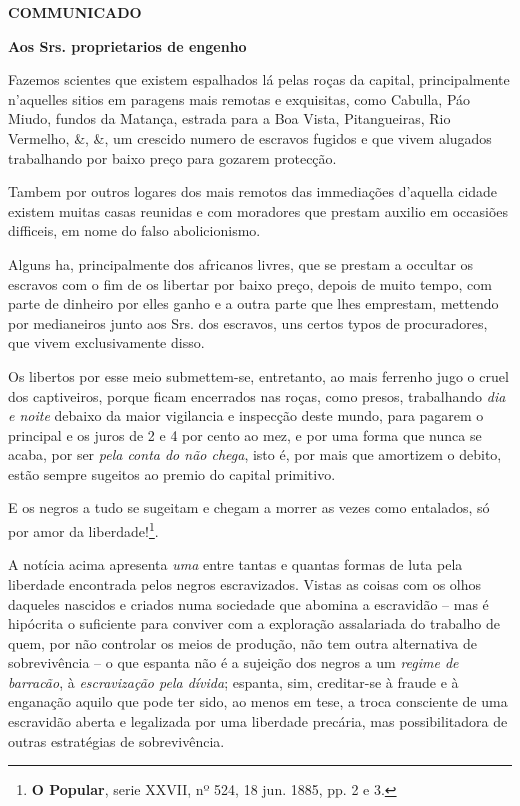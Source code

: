 \begin{citacao}
\textbf{COMMUNICADO}

\textbf{Aos Srs. proprietarios de engenho}

Fazemos scientes que existem espalhados lá pelas roças da capital, principalmente n'aquelles sitios em paragens mais remotas e exquisitas, como Cabulla, Páo Miudo, fundos da Matança, estrada para a Boa Vista, Pitangueiras, Rio Vermelho, \&, \&, um crescido numero de escravos fugidos e que vivem alugados trabalhando por baixo preço para gozarem protecção.

Tambem por outros logares dos mais remotos das immediações d'aquella cidade existem muitas casas reunidas e com moradores que prestam auxilio em occasiões difficeis, em nome do falso abolicionismo.

Alguns ha, principalmente dos africanos livres, que se prestam a occultar os escravos com o fim de os libertar por baixo preço, depois de muito tempo, com parte de dinheiro por elles ganho e a outra parte que lhes emprestam, mettendo por medianeiros junto aos Srs. dos escravos, uns certos typos de procuradores, que vivem exclusivamente disso.

Os libertos por esse meio submettem-se, entretanto, ao mais ferrenho jugo o cruel dos captiveiros, porque ficam encerrados nas roças, como presos, trabalhando \textit{dia e noite} debaixo da maior vigilancia e inspecção deste mundo, para pagarem o principal e os juros de 2 e 4 por cento ao mez, e por uma forma que nunca se acaba, por ser \textit{pela conta do não chega}, isto é, por mais que amortizem o debito, estão sempre sugeitos ao premio do capital primitivo.

E os negros a tudo se sugeitam e chegam a morrer as vezes como entalados, só por amor da liberdade!\footnote{\textbf{O Popular}, serie XXVII, nº 524, 18 jun. 1885, pp. 2 e 3.}.
\end{citacao}

A notícia acima apresenta \textit{uma} entre tantas e quantas formas de luta pela liberdade encontrada pelos negros escravizados. Vistas as coisas com os olhos daqueles nascidos e criados numa sociedade que abomina a escravidão -- mas é hipócrita o suficiente para conviver com a exploração assalariada do trabalho de quem, por não controlar os meios de produção, não tem outra alternativa de sobrevivência -- o que espanta não é a sujeição dos negros a um \textit{regime de barracão}, à \textit{escravização pela dívida}; espanta, sim, creditar-se à fraude e à enganação aquilo que pode ter sido, ao menos em tese, a troca consciente de uma escravidão aberta e legalizada por uma liberdade precária, mas possibilitadora de outras estratégias de sobrevivência.

